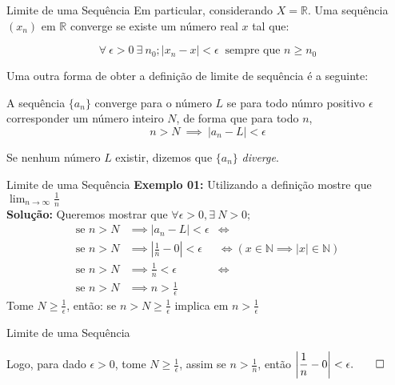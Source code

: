 \documentclass[hyperref={pdfpagelabels=false}]{beamer}
\begin{document}
\begin{frame}{Limite de uma Sequência}
 Em particular, considerando $X = \mathbb{R}$. \pause Uma sequência $(x_n)$ em $\mathbb{R}$ converge se existe um número real $x$ tal que: \pause
 
 $$ \forall ~ \epsilon > 0~ \exists ~ n_0; |x_n - x| < \epsilon ~\text{ sempre que } n \geq n_0$$ \pause 
 
Uma outra forma de obter a definição de limite de sequência é a seguinte: \pause

\begin{definition}
 A sequência $\{a_n\}$ converge para o número $L$ se para todo númro positivo $\epsilon$ corresponder um número inteiro $N$, de forma que para todo $n$,
 $$n > N ~\implies ~|a_n - L| < \epsilon$$ \pause
 
 Se nenhum número $L$ existir, dizemos que $\{a_n\}$ \emph{diverge}.
\end{definition}


\end{frame}

\begin{frame}{Limite de uma Sequência}
 {\bf Exemplo 01:} Utilizando a definição mostre que $\displaystyle \lim_{n \to \infty}\frac{1}{n}$ \\\pause
 {\bf Solução:} \pause Queremos mostrar que $\forall \epsilon > 0, \exists ~N>0;$ \\ \pause
 \begin{align*}
  \text{se } n > N &\implies |a_n - L| < \epsilon &\iff \\ 
  \text{se } n > N &\implies \left| \frac{1}{n} - 0 \right| < \epsilon &\iff (x \in \mathbb{N} \implies |x| \in \mathbb{N}) \\
  \text{se } n > N &\implies \frac{1}{n} < \epsilon &\iff \\
  \text{se } n > N &\implies n > \frac{1}{\epsilon}
 \end{align*} \pause
 Tome $N \geq \displaystyle \frac{1}{\epsilon}$, então: \pause se $n > N \geq \displaystyle \frac{1}{\epsilon}$ implica em $n > \displaystyle \frac{1}{\epsilon}$ \pause
 
 \end{frame}

 \begin{frame}{Limite de uma Sequência}
 
 Logo, para dado $\epsilon > 0$, tome $N \geq \displaystyle \frac{1}{\epsilon}$, assim se $n > \displaystyle \frac{1}{n}$, então $\left| \displaystyle \frac{1}{n} - 0 \right| < \epsilon. \qed$
 
 \end{frame}
\end{document}
